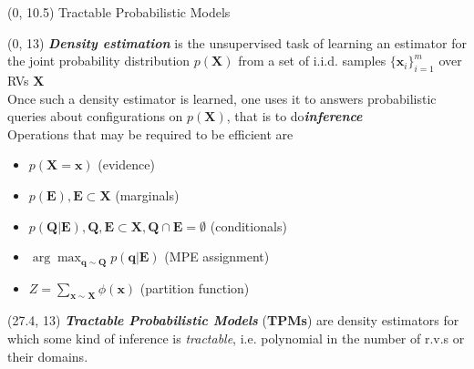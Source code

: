 \documentclass[final]{beamer}
\begin{document}
\begin{frame}{}
  
  \begin{textblock}{80}(0, 10.5)
    Tractable Probabilistic Models
  \end{textblock}
  
  
  \begin{textblock}{25.2}(0, 13)
    \small
    \emph{\textbf{Density estimation}} is the unsupervised task of
    learning an estimator for the joint probability distribution
    $p(\mathbf{X})$ from a set of i.i.d. samples $\{\mathbf
    x_i\}_{i=1}^m$ over RVs $\mathbf{X}$\\[20pt]
    
    Once such a density estimator is learned, one uses it to answers
    probabilistic queries about configurations on $p(\mathbf{X})$,
    that is to do\emph{\textbf{inference}}\\[20pt]
    
    Operations that may be required to be efficient are
    \begin{itemize}
    \item $p(\mathbf{X} = \mathbf{x})$ (evidence) 
    \item $p(\mathbf{E}), \mathbf{E}\subset\mathbf{X}$ (marginals)
    \item $p(\mathbf{Q}|\mathbf{E}), \mathbf{Q},
      \mathbf{E}\subset\mathbf{X}, \mathbf{Q}\cap \mathbf{E}=\emptyset$
      (conditionals)
    \item $\arg\max_{\mathbf{q}\sim\mathbf{Q}}p(\mathbf{q}|\mathbf{E})$
      (MPE assignment)
    \item $Z =\sum_{\mathbf{x}\sim \mathbf{X}}\phi(\mathbf{x})$
      (partition function)
    \end{itemize}
    
  \end{textblock}
  
  \begin{textblock}{25.2}(27.4, 13)
    \small
    \emph{\textbf{Tractable Probabilistic Models}}  (\textbf{TPMs})
    are density estimators for which some kind of inference is
    \emph{tractable}, i.e. polynomial in the number of r.v.s or their domains.
  \end{textblock}

  

\end{frame}
\end{document}
